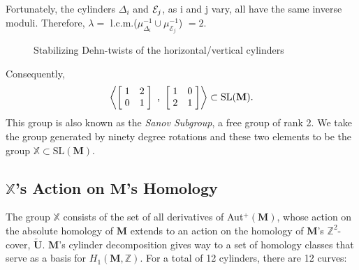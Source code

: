 \documentclass[]{article}
\begin{document}
Fortunately, the cylinders $\Delta_{i}$ and $\small{\mathcal{E}}_j$, as i and j vary, all have the same inverse moduli. Therefore, $\lambda=$ l.c.m.($\mu^{-1}_{\Delta_i}\cup\mu^{-1}_{\mathcal{E}_j}$) $=2$.

\begin{figure}[H]
\centering

\caption{Stabilizing Dehn-twists of the horizontal/vertical cylinders}
\label{fig:skew}
\end{figure}

Consequently, 
\begin{equation}
\left< \left[ \hspace{1mm} \begin{matrix}
				1 &  2\\
				0 & 1
			\end{matrix}\hspace{1mm}\right] \text{ , }
			\left[ \hspace{1mm} \begin{matrix}
							1 & 0\\
							 2 & 1
						\end{matrix}\hspace{1mm}\right] \right>
						\subset \text{SL}(\mathbf M).
\end{equation}
This group is also known as the \emph{Sanov Subgroup}, a free group of rank 2. We take the group generated by ninety degree rotations and these two elements to be the group $\mathbb{X}\subset \text{SL}(\mathbf M)$.
\newpage
\subsection{$\mathbb X$'s Action on $\mathbf M$'s Homology}
The group $\mathbb X$ consists of the set of all derivatives of Aut$^+(\mathbf M)$, whose action on the absolute homology of $\mathbf{M}$ extends to an action on the homology of $\mathbf{M}$'s $\mathbb{Z}^2$-cover, $\tilde{\mathbf{U}}$. $\mathbf{M}$'s cylinder decomposition gives way to a set of homology classes that serve as a basis for $H_1(\mathbf{M},\mathbb Z)$. For a total of 12 cylinders, there are 12 curves:
\end{document}
